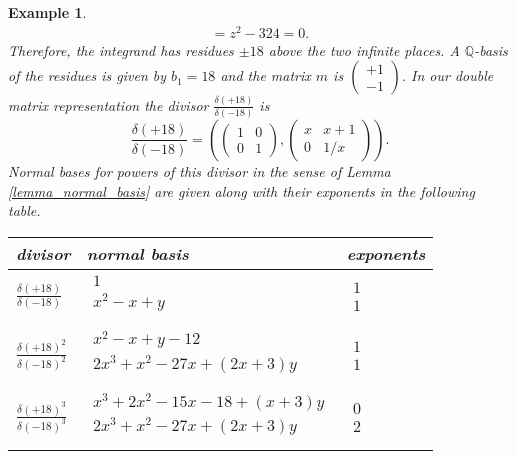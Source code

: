 \documentclass[12pt,reqno]{amsart}
\numberwithin{equation}{section}
\newtheorem{example}[theorem]{Example}
\newcommand\T{\rule{0pt}{4.0ex}}       %
\newcommand\B{\rule[-2.5ex]{0pt}{0pt}} %
\newcommand{\schar}[2] {( \begin{smallmatrix} #1 \\ #2 \end{smallmatrix})}
\newcommand{\bbQ}[0]  { \mathbb{Q}}
\begin{document}
\begin{example}
\begin{gather*}
= z^2-324=0\text{.}
\end{gather*}
Therefore, the integrand has residues $\pm18$ above the two infinite places. A $\bbQ$-basis of the residues is given by $b_1=18$ and the matrix $m$ is $\schar{+1}{-1}$. In our double matrix representation the divisor $\frac{\delta(+18)}{\delta(-18)}$ is
\begin{equation*}
 \frac{\delta(+18)}{\delta(-18)} = \left( \left(
\begin{array}{ccc}
 1 & 0 \\
 0 & 1
\end{array}
\right), \left(
\begin{array}{ccc}
 x & x+1 \\
 0 & 1/x
\end{array}
\right) \right)\text{.}
\end{equation*}
Normal bases for powers of this divisor in the sense of Lemma \ref{lemma_normal_basis} are given along with their exponents in the following table.
\begin{center}
\begin{tabular}{l|ll}
divisor & normal basis & exponents\\
\hline
 $\frac{\delta(+18)}{\delta(-18)}$  &  $\begin{array}{l}
 1 \\
 x^2-x+y \\
\end{array}$ & $\begin{array}{l}1 \\ 1 \end{array}$\T\B\\
\hline 
 $\frac{\delta(+18)^2}{\delta(-18)^2}$  & $\begin{array}{l}
 x^2-x+y-12 \\
 2 x^3+x^2-27 x+(2 x+3) y \\
\end{array}$ & $\begin{array}{l}1 \\ 1 \end{array}$ \T\B\\
\hline
 $\frac{\delta(+18)^3}{\delta(-18)^3}$  & $\begin{array}{l}
 x^3+2 x^2-15 x-18+(x+3) y \\
 2 x^3+x^2-27 x+(2 x+3) y \\
\end{array}$ & $\begin{array}{l}0 \\ 2 \end{array}$ \T\B\\

\end{tabular}
\end{center}
\end{example}
\end{document}
